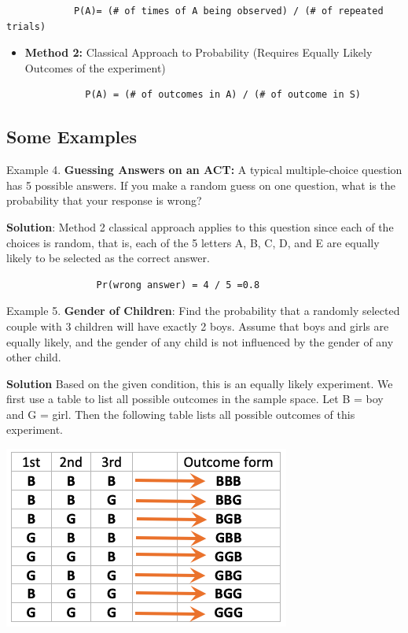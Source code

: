 \documentclass[
]{book}
\providecommand{\tightlist}{%
  \setlength{\itemsep}{0pt}\setlength{\parskip}{0pt}}
\begin{document}
\begin{verbatim}
            P(A)= (# of times of A being observed) / (# of repeated trials)
\end{verbatim}

\begin{itemize}
\tightlist
\item
  \textbf{Method 2:} Classical Approach to Probability (Requires Equally Likely Outcomes of the experiment)
\end{itemize}

\begin{verbatim}
              P(A) = (# of outcomes in A) / (# of outcome in S) 
\end{verbatim}

\hypertarget{some-examples}{%
\subsection{Some Examples}\label{some-examples}}

Example 4. \textbf{Guessing Answers on an ACT:} A typical multiple-choice question has 5 possible answers. If you make a random guess on one question, what is the probability that your response is wrong?

\textbf{Solution}: Method 2 classical approach applies to this question since each of the choices is random, that is, each of the 5 letters A, B, C, D, and E are equally likely to be selected as the correct answer.

\begin{verbatim}
                Pr(wrong answer) = 4 / 5 =0.8
\end{verbatim}

\hfill\break

Example 5. \textbf{Gender of Children}: Find the probability that a randomly selected couple with 3 children will have exactly 2 boys. Assume that boys and girls are equally likely, and the gender of any child is not influenced by the gender of any other child.

\textbf{Solution} Based on the given condition, this is an equally likely experiment. We first use a table to list all possible outcomes in the sample space. Let B = boy and G = girl. Then the following table lists all possible outcomes of this experiment.

\begin{center}\includegraphics[width=0.4\linewidth]{week03/threeKidFamily} \end{center}
\end{document}
